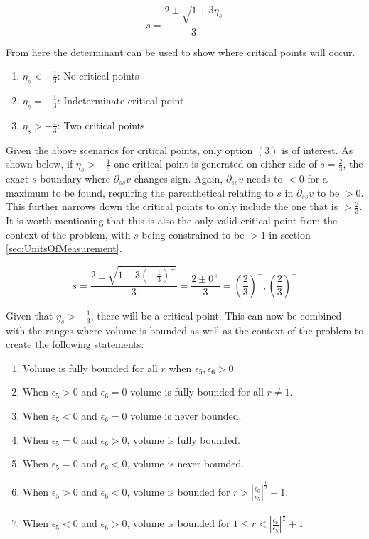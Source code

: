 \begin{equation*}
    s=\frac{2\pm \sqrt{1+3\eta_s}}{3}
\end{equation*}

From here the determinant can be used to show where critical points will occur.

\begin{enumerate}
    \item $\eta_s < -\frac{1}{3}$: No critical points
    \item $\eta_s = -\frac{1}{3}$: Indeterminate critical point
    \item $\eta_s > -\frac{1}{3}$: Two critical points
\end{enumerate}

Given the above scenarios for critical points, only option $(3)$ is of interest. As shown below, if $\eta_s> -\frac{1}{3}$ one critical point is generated on either side of $s=\frac{2}{3}$, the exact $s$ boundary where $\partial_{ss} v$ changes sign. Again, $\partial_{ss} v$ needs to $<0$ for a maximum to be found, requiring the parenthetical relating to $s$ in $\partial_{ss} v$ to be $>0$. This further narrows down the critical points to only include the one that is $>\frac{2}{3}$. It is worth mentioning that this is also the only valid critical point from the context of the problem, with $s$ being constrained to be $>1$ in section \ref{sec:UnitsOfMeasurement}.

\begin{equation*}
    s=\frac{2\pm \sqrt{1+3\left( -\frac{1}{3} \right)^+}}{3}=\frac{2\pm 0^+}{3}=\left( \frac{2}{3} \right)^-, \left( \frac{2}{3} \right)^+
\end{equation*}

Given that $\eta_s>-\frac{1}{3}$, there will be a critical point. This can now be combined with the ranges where volume is bounded as well as the context of the problem to create the following statements:

\begin{enumerate}
    \item Volume is fully bounded for all $r$ when $\epsilon_5,\epsilon_6>0$.
    \item When $\epsilon_5>0$ and $\epsilon_6=0$ volume is fully bounded for all $r\ne 1$.
    \item When $\epsilon_5<0$ and $\epsilon_6=0$ volume is never bounded.
    \item When $\epsilon_5=0$ and $\epsilon_6>0$, volume is fully bounded.
    \item When $\epsilon_5=0$ and $\epsilon_6<0$, volume is never bounded.
    \item When $\epsilon_5>0$ and $\epsilon_6<0$, volume is bounded for $r>\left| \frac{\epsilon_6}{\epsilon_5} \right|^\frac{1}{2}+1$.
    \item When $\epsilon_5<0$ and $\epsilon_6>0$, volume is bounded for $1\le r < \left| \frac{\epsilon_6}{\epsilon_5} \right|^\frac{1}{2}+1$
\end{enumerate}

